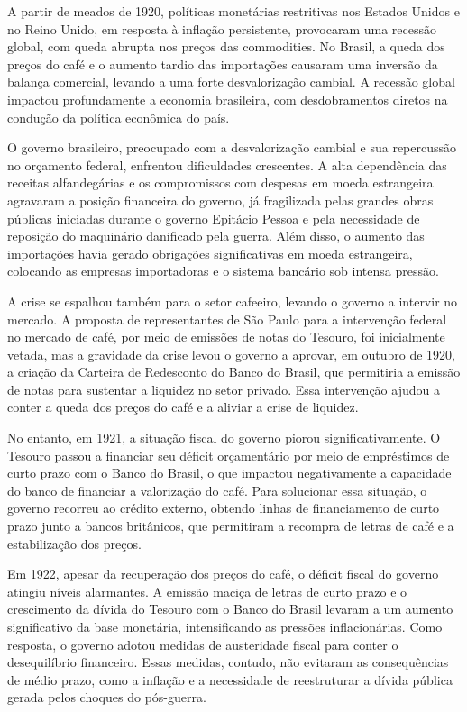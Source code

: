 \documentclass[a4paper,12pt]{article}[abntex2]
\begin{document}
A partir de meados de 1920, políticas monetárias restritivas nos Estados Unidos e no Reino Unido, em resposta à inflação persistente, provocaram uma recessão global, com queda abrupta nos preços das commodities. No Brasil, a queda dos preços do café e o aumento tardio das importações causaram uma inversão da balança comercial, levando a uma forte desvalorização cambial. A recessão global impactou profundamente a economia brasileira, com desdobramentos diretos na condução da política econômica do país.

O governo brasileiro, preocupado com a desvalorização cambial e sua repercussão no orçamento federal, enfrentou dificuldades crescentes. A alta dependência das receitas alfandegárias e os compromissos com despesas em moeda estrangeira agravaram a posição financeira do governo, já fragilizada pelas grandes obras públicas iniciadas durante o governo Epitácio Pessoa e pela necessidade de reposição do maquinário danificado pela guerra. Além disso, o aumento das importações havia gerado obrigações significativas em moeda estrangeira, colocando as empresas importadoras e o sistema bancário sob intensa pressão.

A crise se espalhou também para o setor cafeeiro, levando o governo a intervir no mercado. A proposta de representantes de São Paulo para a intervenção federal no mercado de café, por meio de emissões de notas do Tesouro, foi inicialmente vetada, mas a gravidade da crise levou o governo a aprovar, em outubro de 1920, a criação da Carteira de Redesconto do Banco do Brasil, que permitiria a emissão de notas para sustentar a liquidez no setor privado. Essa intervenção ajudou a conter a queda dos preços do café e a aliviar a crise de liquidez.

No entanto, em 1921, a situação fiscal do governo piorou significativamente. O Tesouro passou a financiar seu déficit orçamentário por meio de empréstimos de curto prazo com o Banco do Brasil, o que impactou negativamente a capacidade do banco de financiar a valorização do café. Para solucionar essa situação, o governo recorreu ao crédito externo, obtendo linhas de financiamento de curto prazo junto a bancos britânicos, que permitiram a recompra de letras de café e a estabilização dos preços.

Em 1922, apesar da recuperação dos preços do café, o déficit fiscal do governo atingiu níveis alarmantes. A emissão maciça de letras de curto prazo e o crescimento da dívida do Tesouro com o Banco do Brasil levaram a um aumento significativo da base monetária, intensificando as pressões inflacionárias. Como resposta, o governo adotou medidas de austeridade fiscal para conter o desequilíbrio financeiro. Essas medidas, contudo, não evitaram as consequências de médio prazo, como a inflação e a necessidade de reestruturar a dívida pública gerada pelos choques do pós-guerra.
\end{document}
